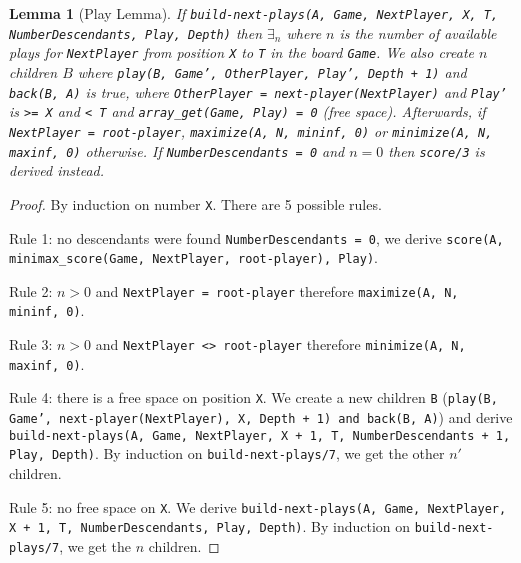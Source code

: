 \documentclass[9pt]{article}
\newtheorem{lemma}{Lemma}
\begin{document}
\begin{lemma}[Play Lemma]
If \texttt{build-next-plays(A, Game, NextPlayer, X, T, NumberDescendants, Play,
   Depth)} then $\exists_n$ where $n$ is the number of available plays for
\texttt{NextPlayer} from position \texttt{X} to \texttt{T} in the board
\texttt{Game}. We also create $n$ children $B$ where \texttt{play(B, Game',
      OtherPlayer, Play', Depth + 1)} and \texttt{back(B, A)} is true, where \texttt{OtherPlayer =
   next-player(NextPlayer)} and \texttt{Play'} is \texttt{>= X} and \texttt{< T}
   and \texttt{array\_get(Game, Play) = 0} (free space). Afterwards, if
   \texttt{NextPlayer = root-player}, \texttt{maximize(A, N, mininf, 0)} or
   \texttt{minimize(A, N, maxinf, 0)} otherwise. If \texttt{NumberDescendants =
      0} and $n = 0$ then \texttt{score/3} is derived instead.
\end{lemma}
\begin{proof}
By induction on number \texttt{X}. There are 5 possible rules.

Rule 1: no descendants were found \texttt{NumberDescendants = 0}, we derive
\texttt{score(A, minimax\_score(Game, NextPlayer, root-player), Play)}.

Rule 2: $n > 0$ and \texttt{NextPlayer = root-player} therefore
\texttt{maximize(A, N, mininf, 0)}.

Rule 3: $n > 0$ and \texttt{NextPlayer <> root-player} therefore
\texttt{minimize(A, N, maxinf, 0)}.

Rule 4: there is a free space on position \texttt{X}. We create a new children
\texttt{B} (\texttt{play(B, Game', next-player(NextPlayer), X, Depth + 1) and
\texttt{back(B, A)}}) and derive \texttt{build-next-plays(A, Game, NextPlayer,
X + 1, T, NumberDescendants + 1, Play, Depth)}. By induction on
\texttt{build-next-plays/7}, we get the other $n'$ children.

Rule 5: no free space on \texttt{X}. We derive \texttt{build-next-plays(A, Game,
NextPlayer, X + 1, T, NumberDescendants, Play, Depth)}. By induction on
\texttt{build-next-plays/7}, we get the $n$ children.

\end{proof}
\end{document}
